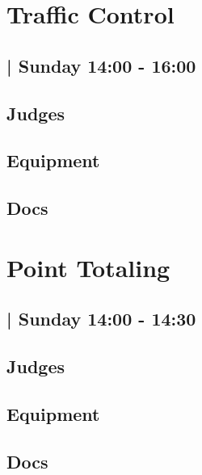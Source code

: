 \documentclass[10pt]{article}
\begin{document}
		\begin{minipage}{\linewidth}
		\setcounter{section}{48}
	\section{Traffic Control }
	\subsection*{ | Sunday 14:00 - 16:00}

	

	\begin{multicols}{2}
	\subsection*{\faUsers \: Judges}
	\begin{itemize}
		\end{itemize}
	\columnbreak
	\subsection*{\faWrench \: Equipment}
	        \vfill\null
        \subsection*{\faFile \: Docs}
     	\end{multicols}


	\vspace{1cm}
	\end{minipage}

		\begin{minipage}{\linewidth}
		\setcounter{section}{49}
	\section{Point Totaling }
	\subsection*{ | Sunday 14:00 - 14:30}

	

	\begin{multicols}{2}
	\subsection*{\faUsers \: Judges}
	\begin{itemize}
		\end{itemize}
	\columnbreak
	\subsection*{\faWrench \: Equipment}
	        \vfill\null
        \subsection*{\faFile \: Docs}
     	\end{multicols}


	\vspace{1cm}
	\end{minipage}
\end{document}
